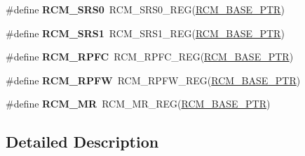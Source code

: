 \begin{DoxyCompactItemize}
\item 
\hypertarget{group___r_c_m___register___accessor___macros_gaae0200bfd0eb1d7f7fd0d142c21fe92a}{}\#define {\bfseries R\+C\+M\+\_\+\+S\+R\+S0}~R\+C\+M\+\_\+\+S\+R\+S0\+\_\+\+R\+E\+G(\hyperlink{group___r_c_m___peripheral_ga25ab3aa8d593d455ed36a52c77f88234}{R\+C\+M\+\_\+\+B\+A\+S\+E\+\_\+\+P\+T\+R})\label{group___r_c_m___register___accessor___macros_gaae0200bfd0eb1d7f7fd0d142c21fe92a}

\item 
\hypertarget{group___r_c_m___register___accessor___macros_gaa2e190bc843511a82e9ec826029fbaaa}{}\#define {\bfseries R\+C\+M\+\_\+\+S\+R\+S1}~R\+C\+M\+\_\+\+S\+R\+S1\+\_\+\+R\+E\+G(\hyperlink{group___r_c_m___peripheral_ga25ab3aa8d593d455ed36a52c77f88234}{R\+C\+M\+\_\+\+B\+A\+S\+E\+\_\+\+P\+T\+R})\label{group___r_c_m___register___accessor___macros_gaa2e190bc843511a82e9ec826029fbaaa}

\item 
\hypertarget{group___r_c_m___register___accessor___macros_ga1c19f66051e218d534efc33ec09cc461}{}\#define {\bfseries R\+C\+M\+\_\+\+R\+P\+F\+C}~R\+C\+M\+\_\+\+R\+P\+F\+C\+\_\+\+R\+E\+G(\hyperlink{group___r_c_m___peripheral_ga25ab3aa8d593d455ed36a52c77f88234}{R\+C\+M\+\_\+\+B\+A\+S\+E\+\_\+\+P\+T\+R})\label{group___r_c_m___register___accessor___macros_ga1c19f66051e218d534efc33ec09cc461}

\item 
\hypertarget{group___r_c_m___register___accessor___macros_ga4cf7545d65e6e6c3e1848b7687d8f367}{}\#define {\bfseries R\+C\+M\+\_\+\+R\+P\+F\+W}~R\+C\+M\+\_\+\+R\+P\+F\+W\+\_\+\+R\+E\+G(\hyperlink{group___r_c_m___peripheral_ga25ab3aa8d593d455ed36a52c77f88234}{R\+C\+M\+\_\+\+B\+A\+S\+E\+\_\+\+P\+T\+R})\label{group___r_c_m___register___accessor___macros_ga4cf7545d65e6e6c3e1848b7687d8f367}

\item 
\hypertarget{group___r_c_m___register___accessor___macros_ga98ac6d022fbfe501bcc3555e2cd2ebbe}{}\#define {\bfseries R\+C\+M\+\_\+\+M\+R}~R\+C\+M\+\_\+\+M\+R\+\_\+\+R\+E\+G(\hyperlink{group___r_c_m___peripheral_ga25ab3aa8d593d455ed36a52c77f88234}{R\+C\+M\+\_\+\+B\+A\+S\+E\+\_\+\+P\+T\+R})\label{group___r_c_m___register___accessor___macros_ga98ac6d022fbfe501bcc3555e2cd2ebbe}

\end{DoxyCompactItemize}


\subsection{Detailed Description}
